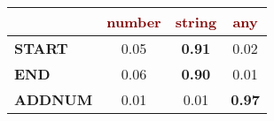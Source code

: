 \renewcommand{\arraystretch}{0.5}
\scriptsize
\begin{tabular}{@{}l c@{\hskip 1mm} c@{\hskip 1mm} c@{}}
\toprule
& \textbf{\textcolor{Maroon}{number}} & \textbf{\textcolor{Maroon}{string}} & \textbf{\textcolor{Maroon}{any}}\\ 
\midrule
\textbf{\textcolor{mygreen}{START}} & 0.05 & \textbf{0.91} & 0.02\\
\textbf{\textcolor{mygreen}{END}} & 0.06 & \textbf{0.90} & 0.01\\
\textbf{\textcolor{mygreen}{ADDNUM}} & 0.01 & 0.01 & \textbf{0.97}\\
\bottomrule
\end{tabular}